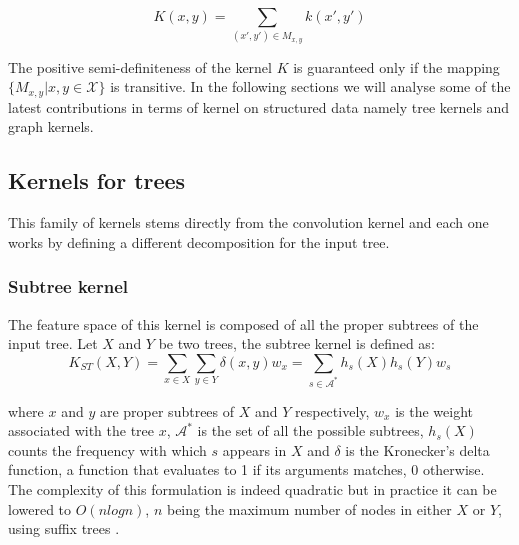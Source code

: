 \begin{equation}
    K(x,y) = \sum_{(x',y') \in M_{x,y}} k(x',y')
\end{equation}

The positive semi-definiteness of the kernel $K$ is guaranteed only if the
mapping $\{M_{x,y}|x,y \in \mathcal{X}\}$ is transitive.
In the following sections we will analyse some of the latest contributions in terms
of kernel on structured data namely tree kernels and graph kernels.

\subsection{Kernels for trees}
This family of kernels stems directly from the convolution kernel and each one
works by defining a different decomposition for the input tree.

\subsubsection{Subtree kernel}
\label{subsubsec:st}
The feature space of this kernel is composed of all the proper subtrees of the
input tree.
Let $X$ and $Y$ be two trees, the  subtree kernel is defined as:
\begin{equation}
    K_{ST}(X,Y) = \sum_{x \in X} \sum_{y \in Y} \delta(x,y)w_x =
    \sum_{s \in \mathcal{A}^*} h_s(X)h_s(Y)w_s
\end{equation}

where $x$ and $y$ are proper subtrees of $X$ and $Y$ respectively, $w_x$ is the 
weight associated with the tree $x$, $\mathcal{A}^*$ is the set of all the possible
subtrees, $h_s(X)$ counts the frequency with which $s$ appears in $X$ and
$\delta$ is the Kronecker's delta function, a function that evaluates to 1 if its
arguments matches, 0 otherwise.
The complexity of this formulation is indeed quadratic but in practice it can be
lowered to $O(nlogn)$, $n$ being the maximum number of nodes in either $X$ or $Y$,
using suffix trees \cite{viswanathan04fastkernels}.

